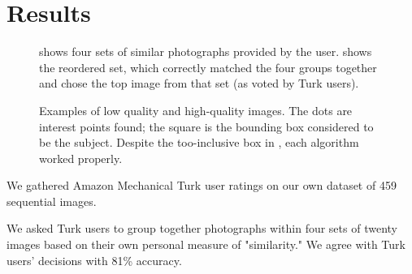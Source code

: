 \documentclass{article}
\begin{document}
\section{Results}

\begin{figure*}[t!]
\centering
{}
\caption{ shows four sets of similar photographs provided by the user.  shows the reordered set, which correctly matched the four groups together and chose the top image from that set (as voted by Turk users).}
\label{fig:ResultSorting}
\end{figure*}

\begin{figure*}[t!]
\centering
{}
\caption{Examples of  low quality and  high-quality images. The dots are interest points found; the square is the bounding box considered to be the subject. Despite the too-inclusive box in , each algorithm worked properly.}
\label{fig:Examples}
\end{figure*}

We gathered Amazon Mechanical Turk user ratings on our own dataset of 459 sequential images.


We asked Turk users to group together photographs within four sets of twenty images based on their own personal measure of "similarity." We agree with Turk users' decisions with 81\% accuracy.

\end{document}
